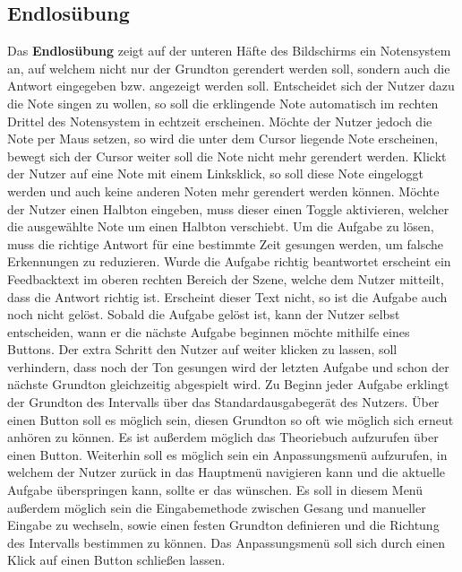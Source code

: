 \subsection{Endlosübung}
Das \textbf{Endlosübung} zeigt auf der unteren Häfte des Bildschirms ein Notensystem an, auf welchem nicht nur der Grundton gerendert werden soll, sondern auch die Antwort eingegeben bzw. angezeigt werden soll. Entscheidet sich der Nutzer dazu die Note singen zu wollen, so soll die erklingende Note automatisch im rechten Drittel des Notensystem in echtzeit erscheinen. Möchte der Nutzer jedoch die Note per Maus setzen, so wird die unter dem Cursor liegende Note erscheinen, bewegt sich der Cursor weiter soll die Note nicht mehr gerendert werden. Klickt der Nutzer auf eine Note mit einem Linksklick, so soll diese Note eingeloggt werden und auch keine anderen Noten mehr gerendert werden können. Möchte der Nutzer einen Halbton eingeben, muss dieser einen Toggle aktivieren, welcher die ausgewählte Note um einen Halbton verschiebt. Um die Aufgabe zu lösen, muss die richtige Antwort für eine bestimmte Zeit gesungen werden, um falsche Erkennungen zu reduzieren. Wurde die Aufgabe richtig beantwortet erscheint ein Feedbacktext im oberen rechten Bereich der Szene, welche dem Nutzer mitteilt, dass die Antwort richtig ist. Erscheint dieser Text nicht, so ist die Aufgabe auch noch nicht gelöst. Sobald die Aufgabe gelöst ist, kann der Nutzer selbst entscheiden, wann er die nächste Aufgabe beginnen möchte mithilfe eines Buttons. Der extra Schritt den Nutzer auf weiter klicken zu lassen, soll verhindern, dass noch der Ton gesungen wird der letzten Aufgabe und schon der nächste Grundton gleichzeitig abgespielt wird. Zu Beginn jeder Aufgabe erklingt der Grundton des Intervalls über das Standardausgabegerät des Nutzers. Über einen Button soll es möglich sein, diesen Grundton so oft wie möglich sich erneut anhören zu können. Es ist außerdem möglich das Theoriebuch aufzurufen über einen Button. Weiterhin soll es möglich sein ein Anpassungsmenü aufzurufen, in welchem der Nutzer zurück in das Hauptmenü navigieren kann und die aktuelle Aufgabe überspringen kann, sollte er das wünschen. Es soll in diesem Menü außerdem möglich sein die Eingabemethode zwischen Gesang und manueller Eingabe zu wechseln, sowie einen festen Grundton definieren und die Richtung des Intervalls bestimmen zu können. Das Anpassungsmenü soll sich durch einen Klick auf einen Button schließen lassen. 


